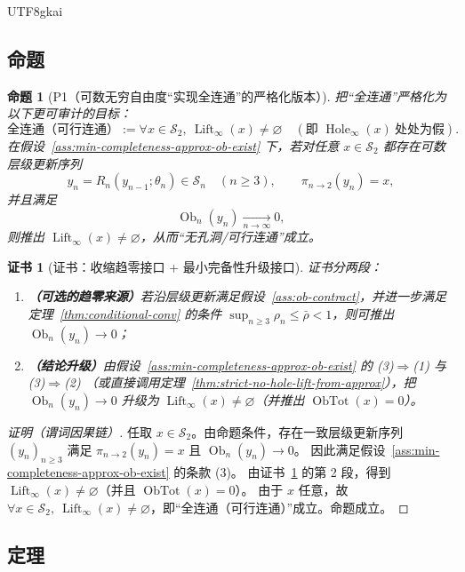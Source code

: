 \documentclass[12pt]{article}
\newtheorem{proposition}{命题}[section]
\newtheorem{Certificate}{证书}[section]
\newcommand{\Ob}{\operatorname{Ob}}
\newcommand{\ObTot}{\operatorname{ObTot}}
\newcommand{\Hole}{\operatorname{Hole}}
\newcommand{\Lift}{\operatorname{Lift}}
\begin{document}
\begin{CJK*}{UTF8}{gkai}
\subsection{命题}

\begin{proposition}[P1（可数无穷自由度“实现全连通”的严格化版本）]\label{prop:P1-countable-global-feasible-connectivity}
把“全连通”严格化为以下更可审计的目标：
\[
\textbf{全连通（可行连通）}:=\forall x\in\mathcal S_2,\ \Lift_\infty(x)\neq\varnothing
\quad(\text{即 }\Hole_\infty(x)\ \text{处处为假}).
\]
在假设~\ref{ass:min-completeness-approx-ob-exist} 下，若对任意 $x\in\mathcal S_2$ 都存在可数层级更新序列
\[
y_n=R_n(y_{n-1};\theta_n)\in\mathcal S_n\quad(n\ge3),
\qquad
\pi_{n\to2}(y_n)=x,
\]
并且满足
\[
\Ob_n(y_n)\xrightarrow[n\to\infty]{}0,
\]
则推出 $\Lift_\infty(x)\neq\varnothing$，从而“无孔洞/可行连通”成立。
\end{proposition}

\begin{Certificate}[证书：收缩趋零接口 + 最小完备性升级接口]\label{cert:P1-countable-global-feasible-connectivity}
证书分两段：
\begin{enumerate}
\item \textbf{（可选的趋零来源）}若沿层级更新满足假设~\ref{ass:ob-contract}，并进一步满足定理~\ref{thm:conditional-conv} 的条件 $\sup_{n\ge3}
  \rho_n\le\bar\rho<1$，则可推出 $\Ob_n(y_n)\to0$；
\item \textbf{（结论升级）}由假设~\ref{ass:min-completeness-approx-ob-exist} 的 (3)$\Rightarrow$(1) 与 (3)$\Rightarrow$(2)
  （或直接调用定理~\ref{thm:strict-no-hole-lift-from-approx}），把 $\Ob_n(y_n)\to0$ 升级为 $\Lift_\infty(x)\neq\varnothing$（并推出
  $\ObTot(x)=0$）。
\end{enumerate}
\end{Certificate}

\begin{proof}[证明（谓词因果链）]
任取 $x\in\mathcal S_2$。由命题条件，存在一致层级更新序列 $(y_n)_{n\ge3}$ 满足 $\pi_{n\to2}(y_n)=x$ 且 $\Ob_n(y_n)\to0$。
因此满足假设~\ref{ass:min-completeness-approx-ob-exist} 的条款 (3)。
由证书~\ref{cert:P1-countable-global-feasible-connectivity} 的第 2 段，得到 $\Lift_\infty(x)\neq\varnothing$（并且 $\ObTot(x)=0$）。
由于 $x$ 任意，故 $\forall x\in\mathcal S_2,\ \Lift_\infty(x)\neq\varnothing$，即“全连通（可行连通）”成立。命题成立。
\end{proof}

\subsection{定理}


\end{CJK*}
\end{document}
